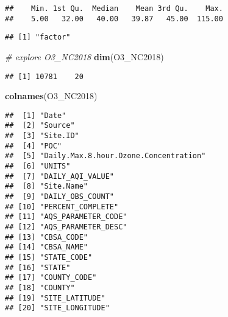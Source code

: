 \documentclass[]{article}
\newenvironment{Shaded}{\begin{snugshade}}{\end{snugshade}}
\newcommand{\KeywordTok}[1]{\textcolor[rgb]{0.13,0.29,0.53}{\textbf{#1}}}
\newcommand{\CommentTok}[1]{\textcolor[rgb]{0.56,0.35,0.01}{\textit{#1}}}
\newcommand{\OperatorTok}[1]{\textcolor[rgb]{0.81,0.36,0.00}{\textbf{#1}}}
\newcommand{\NormalTok}[1]{#1}
\begin{document}
\begin{verbatim}
##    Min. 1st Qu.  Median    Mean 3rd Qu.    Max. 
##    5.00   32.00   40.00   39.87   45.00  115.00
\end{verbatim}

\begin{Shaded}
\end{Shaded}

\begin{verbatim}
## [1] "factor"
\end{verbatim}

\begin{Shaded}
\begin{Highlighting}[]
\CommentTok{# explore O3_NC2018}
\KeywordTok{dim}\NormalTok{(O3_NC2018)}
\end{Highlighting}
\end{Shaded}

\begin{verbatim}
## [1] 10781    20
\end{verbatim}

\begin{Shaded}
\begin{Highlighting}[]
\KeywordTok{colnames}\NormalTok{(O3_NC2018)}
\end{Highlighting}
\end{Shaded}

\begin{verbatim}
##  [1] "Date"                                
##  [2] "Source"                              
##  [3] "Site.ID"                             
##  [4] "POC"                                 
##  [5] "Daily.Max.8.hour.Ozone.Concentration"
##  [6] "UNITS"                               
##  [7] "DAILY_AQI_VALUE"                     
##  [8] "Site.Name"                           
##  [9] "DAILY_OBS_COUNT"                     
## [10] "PERCENT_COMPLETE"                    
## [11] "AQS_PARAMETER_CODE"                  
## [12] "AQS_PARAMETER_DESC"                  
## [13] "CBSA_CODE"                           
## [14] "CBSA_NAME"                           
## [15] "STATE_CODE"                          
## [16] "STATE"                               
## [17] "COUNTY_CODE"                         
## [18] "COUNTY"                              
## [19] "SITE_LATITUDE"                       
## [20] "SITE_LONGITUDE"
\end{verbatim}
\end{document}
